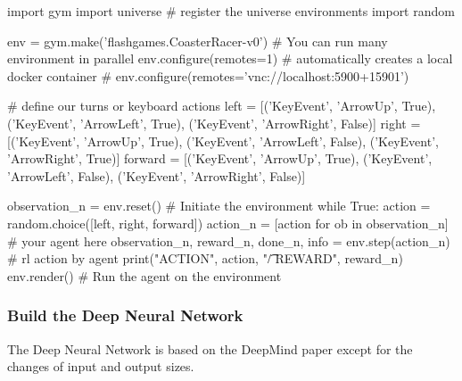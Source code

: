 \documentclass[a4paper]{article}
\begin{document}
\begin{python}
import gym
import universe # register the universe environments
import random

env = gym.make('flashgames.CoasterRacer-v0')  # You can run many environment in parallel
env.configure(remotes=1)  # automatically creates a local docker container
# env.configure(remotes='vnc://localhost:5900+15901')

# define our turns or keyboard actions
left = [('KeyEvent', 'ArrowUp', True),
          ('KeyEvent', 'ArrowLeft', True),
          ('KeyEvent', 'ArrowRight', False)]
right = [('KeyEvent', 'ArrowUp', True),
            ('KeyEvent', 'ArrowLeft', False),
            ('KeyEvent', 'ArrowRight', True)]
forward = [('KeyEvent', 'ArrowUp', True),
                 ('KeyEvent', 'ArrowLeft', False),
                 ('KeyEvent', 'ArrowRight', False)]

observation_n = env.reset()  # Initiate the environment
while True:
    action = random.choice([left, right, forward])
    action_n = [action for ob in observation_n]  # your agent here
    observation_n, reward_n, done_n, info = env.step(action_n)  # rl action by agent
    print("ACTION", action, "\t/ REWARD", reward_n)
    env.render()  # Run the agent on the environment
\end{python}

\subsubsection{Build the Deep Neural Network}

The Deep Neural Network is based on the DeepMind paper except for the changes of input and output sizes.
\end{document}
